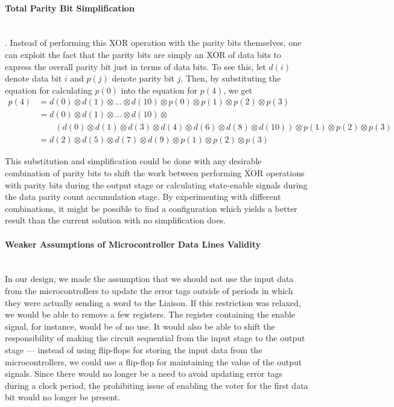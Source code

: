 \paragraph{Total Parity Bit Simplification} \hfill \\
. Instead of
performing this XOR operation with the parity bits themselves, one can
exploit the fact that the parity bits are simply an XOR of data bits
to express the overall parity bit just in terms of data bits. To see
this, let $d(i)$ denote data bit $i$ and $p(j)$ denote parity bit $j$.
Then, by substituting the equation for calculating $p(0)$ into the
equation for $p(4)$, we get
\begin{align*}
  p(4) &= d(0) \otimes d(1) \otimes \ldots \otimes d(10) \otimes p(0) \otimes p(1) \otimes p(2) \otimes p(3) \\
  &= d(0) \otimes d(1) \otimes \ldots \otimes d(10) \otimes \\
  & \qquad (d(0) \otimes d(1) \otimes d(3) \otimes d(4) \otimes d(6)
  \otimes d(8) \otimes d(10)) \otimes p(1) \otimes p(2) \otimes p(3) \\
  &= d(2) \otimes d(5) \otimes d(7) \otimes d(9) \otimes p(1) \otimes p(2) \otimes p(3)
\end{align*}

This substitution and simplification could be done with any desirable
combination of parity bits to shift the work between performing XOR
operations with parity bits during the output stage or calculating
state-enable signals during the data parity count accumulation
stage. By experimenting with different combinations, it might be
possible to find a configuration which yields a better
result than the current solution with no simplification does. 

\paragraph{Weaker Assumptions of Microcontroller Data Lines Validity} \hfill \\
In our design, we made the assumption that we should not use the input
data from the microcontrollers to update the error tags outside of
periods in which they were actually sending a word to the Liaison. If
this restriction was relaxed, we would be able to remove a few
registers. The register containing the enable signal, for instance,
would be of no use. It would also be able to shift the responsibility
of making the circuit sequential from the input stage to the output
stage --- instead of using flip-flops for storing the input data from
the microcontrollers, we could use a flip-flop for maintaining the
value of the output signals. Since there would no longer be a need to
avoid updating error tags during a clock period, the prohibiting issue
of enabling the voter for the first data bit would no longer be
present.


